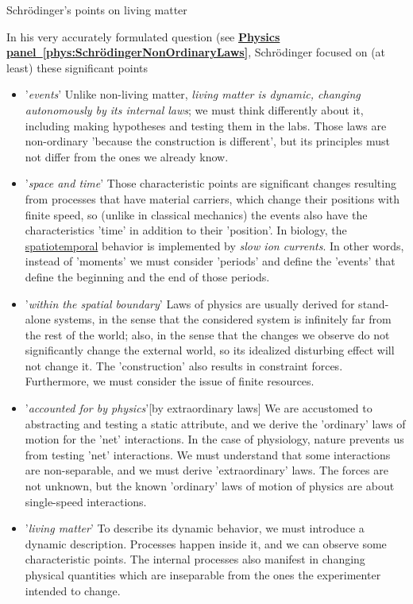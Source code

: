{Schrödinger's points on living matter}
{
In his very accurately formulated question (see \hyperlink{phys:SchrödingerNonOrdinaryLaws}
{\textbf{Physics panel~\ref{phys:SchrödingerNonOrdinaryLaws}}}, 
Schrödinger focused on (at least) these significant points
\begin{itemize}
\item '\textit{events}'  Unlike non-living matter, \textit{living matter is dynamic, changing autonomously by its internal laws}; we must think differently about it, including making hypotheses and testing them in the labs.
Those laws are non-ordinary 'because the construction is different', but its principles must not differ from the ones we already know.
\item '\textit{space and time}' Those characteristic points are significant changes resulting from processes that have material carriers,
which change their positions with finite speed, so (unlike in classical mechanics) the events also have the characteristics 'time' in addition to their 'position'.
In biology, the \hyperlink{spatiotemporal}{spatiotemporal} behavior is implemented by \textit{slow ion currents}.
In other words, instead of 'moments' we must consider 'periods'
and define the 'events' that define the beginning and the end of those periods.
\item '\textit{within the spatial boundary}'
Laws of physics are usually derived for stand-alone systems, in the sense that
the considered system is infinitely far from the rest of the world; also, in the sense that the changes we observe do not significantly change the external world, so its idealized disturbing effect will not change it.
The 'construction' also results in constraint forces. Furthermore,  we must consider the issue of finite resources.
\item '\textit{accounted for by physics}'[by extraordinary laws]
We are accustomed to abstracting and testing a static attribute, and we derive the 'ordinary' laws of motion for the 'net' interactions.
In the case of physiology, nature prevents us from testing 'net' interactions.
We must understand that some interactions are non-separable, and we must derive 'extraordinary' laws.
The forces are not unknown, but the known 'ordinary' laws of motion of physics are about single-speed interactions.
\item '\textit{living matter}' To describe its dynamic behavior, we must introduce a dynamic description. Processes happen inside it, and we can observe some characteristic points.  
The internal processes also manifest in changing physical quantities
which are inseparable from the ones the experimenter intended to change. 


\end{itemize}}
